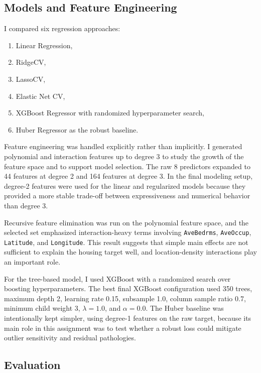 \subsection{Models and Feature Engineering}

I compared six regression approaches:
\begin{enumerate}
  \item Linear Regression,
  \item RidgeCV,
  \item LassoCV,
  \item Elastic Net CV,
  \item XGBoost Regressor with randomized hyperparameter search,
  \item Huber Regressor as the robust baseline.
\end{enumerate}

Feature engineering was handled explicitly rather than implicitly. I generated polynomial and interaction features up to degree 3 to study the growth of the feature space and to support model selection. The raw 8 predictors expanded to 44 features at degree 2 and 164 features at degree 3. In the final modeling setup, degree-2 features were used for the linear and regularized models because they provided a more stable trade-off between expressiveness and numerical behavior than degree 3.

Recursive feature elimination was run on the polynomial feature space, and the selected set emphasized interaction-heavy terms involving \texttt{AveBedrms}, \texttt{AveOccup}, \texttt{Latitude}, and \texttt{Longitude}. This result suggests that simple main effects are not sufficient to explain the housing target well, and location-density interactions play an important role.

For the tree-based model, I used XGBoost \cite{chen2016xgboost} with a randomized search over boosting hyperparameters. The best final XGBoost configuration used 350 trees, maximum depth 2, learning rate 0.15, subsample 1.0, column sample ratio 0.7, minimum child weight 3, \(\lambda=1.0\), and \(\alpha=0.0\). The Huber baseline was intentionally kept simpler, using degree-1 features on the raw target, because its main role in this assignment was to test whether a robust loss could mitigate outlier sensitivity and residual pathologies.

\subsection{Evaluation}


